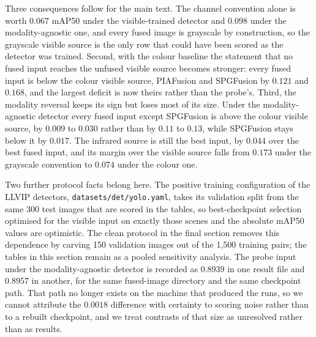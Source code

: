 \documentclass[11pt,a4paper]{article}
\begin{document}
Three consequences follow for the main text. The channel convention alone is worth
$0.067$ mAP50 under the visible-trained detector and $0.098$ under the
modality-agnostic one, and every fused image is grayscale by construction, so the
grayscale visible source is the only row that could have been scored as the detector
was trained. Second, with the colour baseline the statement that no fused input
reaches the unfused visible source becomes stronger: every fused input is below the
colour visible source, PIAFusion and SPGFusion by $0.121$ and $0.168$, and the
largest deficit is now theirs rather than the probe's. Third, the modality reversal
keeps its sign but loses most of its size. Under the modality-agnostic detector every
fused input except SPGFusion is above the colour visible source, by $0.009$ to
$0.030$ rather than by $0.11$ to $0.13$, while SPGFusion stays below it by $0.017$.
The infrared source is still the best input, by $0.044$ over the best fused input,
and its margin over the visible source falls from $0.173$ under the grayscale
convention to $0.074$ under the colour one.

Two further protocol facts belong here. The positive training configuration of the
LLVIP detectors, \texttt{datasets/det/yolo.yaml}, takes its validation split from the
same 300 test images that are scored in the tables, so best-checkpoint selection
optimised for the visible input on exactly those scenes and the absolute mAP50 values
are optimistic. The clean protocol in the final section removes this dependence by
carving 150 validation images out of the 1,500 training pairs; the tables in this
section remain as a pooled sensitivity analysis. The probe input under the
modality-agnostic detector is recorded
as $0.8939$ in one result file and $0.8957$ in another, for the same fused-image
directory and the same checkpoint path. That path no longer exists on the machine
that produced the runs, so we cannot attribute the $0.0018$ difference with certainty
to scoring noise rather than to a rebuilt checkpoint, and we treat contrasts of that
size as unresolved rather than as results.
\end{document}
